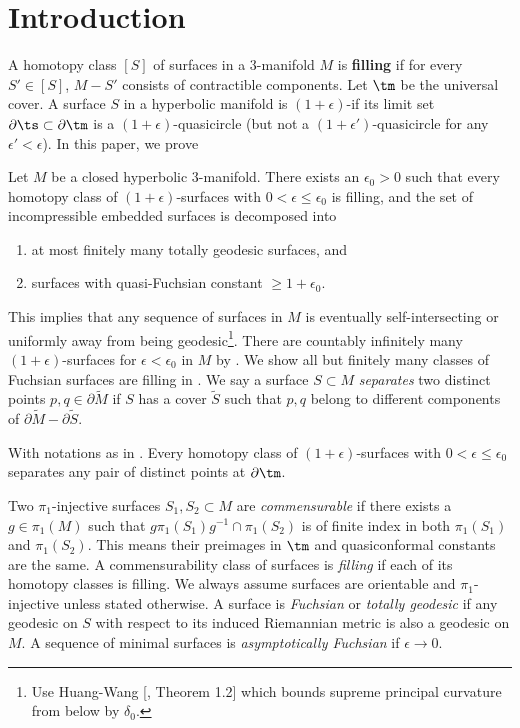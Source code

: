 \section{Introduction}
A homotopy class $[S]$ of surfaces in a $3$-manifold $M$ is  \textbf{filling} if for every $S' \in [S]$, $M-S'$ consists of contractible components. Let $\tm$ be the universal cover. A surface $S$ in a hyperbolic manifold is $(1+\epsilon)$-\qf if its limit set $\partial\ts \subset \partial \tm$ is a $(1+\epsilon)$-quasicircle (but not a $(1+\epsilon')$-quasicircle for any $\epsilon'<\epsilon$). In this paper, we prove
\begin{theorem}\label{almost all quasi-Fuchsian are filling}
	Let $M$ be a closed hyperbolic $3$-manifold. There exists an $\epsilon_0>0$ such that every homotopy class of  $(1+\epsilon)$-\qf surfaces with $0<\epsilon\leq \epsilon_0$ is filling, and the set of incompressible embedded surfaces is decomposed into 
	\begin{enumerate}
		\item at most finitely many totally geodesic surfaces, and
		\item surfaces with quasi-Fuchsian constant $\geq 1+\epsilon_0$. 
	\end{enumerate}
\end{theorem}
This implies that any sequence of surfaces in $M$ is eventually self-intersecting or uniformly away from being geodesic\footnote{Use Huang-Wang [, Theorem 1.2] which bounds supreme principal curvature from below by $\delta_0$.}. There are countably infinitely many $(1+\epsilon)$-\qf surfaces for $\epsilon<\epsilon_0$ in $M$ by \cite{kmImmersingAlmostGeodesic}. We show all but finitely many \cbility classes of Fuchsian surfaces are filling in . We say a surface $S\subset M$ \textit{separates} two distinct points $p, q \in  \partial \widetilde{M}$ if $S$ has a cover $\widetilde{S}$ such that  $p, q$ belong to different components of $\partial \widetilde{M}-\partial\widetilde{S}$. 
\begin{cor}\label{all but finitely many separate any pairs of distinct points}
	With notations as in . Every homotopy class of $(1+\epsilon)$-\qf surfaces with $0<\epsilon\leq \epsilon_0$ separates any pair of distinct points at $\partial \tm$. 
\end{cor}
Two $\pi_1$-injective surfaces $S_1, S_2 \subset M$ are \textit{commensurable} if there exists a $g\in \pi_1(M)$ such that $g\pi_1(S_1)g^{-1}\cap\pi_1(S_2)$ is of finite index in both $\pi_1(S_1)$ and $\pi_1(S_2)$. This means their preimages in $\tm$ and quasiconformal constants are the same. A commensurability class of surfaces is \textit{filling} if each of its homotopy classes is filling. We always assume surfaces are orientable and $\pi_1$-injective unless stated otherwise. A surface is \textit{Fuchsian} or \textit{totally geodesic} if any geodesic on $S$ with respect to its induced Riemannian metric is also a geodesic on $M$. A sequence of \eqf minimal surfaces is  \textit{asymptotically Fuchsian} if $\epsilon\rightarrow 0$.
